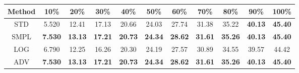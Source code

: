 \documentclass{standalone}
\begin{document}
\begin{tabular}{c|cccccccccc}
      \toprule
      Method & 10\% & 20\% & 30\% & 40\% & 50\% & 60\% & 70\% & 80\% & 90\% & 100\% \\
      \midrule
STD & 5.520 & 12.41 & 17.13 & 20.66 & 24.03 & 27.74 & 31.38 & 35.22 & \textbf{40.13} & \textbf{45.40}\\
SMPL & \textbf{7.530} & \textbf{13.13} & \textbf{17.21} & \textbf{20.73} & \textbf{24.34} & \textbf{28.62} & \textbf{31.61} & \textbf{35.26} & \textbf{40.13} & \textbf{45.40}\\
LOG & 6.790 & 12.25 & 16.26 & 20.30 & 24.19 & 27.57 & 30.89 & 34.55 & 39.57 & 44.42\\
ADV & \textbf{7.530} & \textbf{13.13} & \textbf{17.21} & \textbf{20.73} & \textbf{24.34} & \textbf{28.62} & \textbf{31.61} & \textbf{35.26} & \textbf{40.13} & \textbf{45.40}\\
  \bottomrule
\end{tabular}
\end{document}
